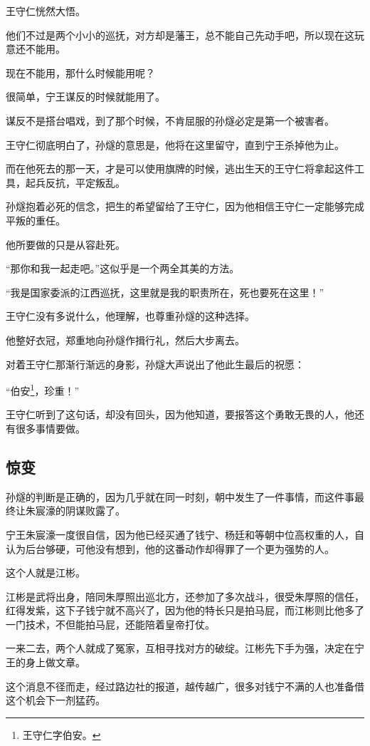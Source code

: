 \begin{multicols}{\theparacolNo}
		王守仁恍然大悟。

		他们不过是两个小小的巡抚，对方却是藩王，总不能自己先动手吧，所以现在这玩意还不能用。

		现在不能用，那什么时候能用呢？

		很简单，宁王谋反的时候就能用了。

		谋反不是搭台唱戏，到了那个时候，不肯屈服的孙燧必定是第一个被害者。

		王守仁彻底明白了，孙燧的意思是，他将在这里留守，直到宁王杀掉他为止。

		而在他死去的那一天，才是可以使用旗牌的时候，逃出生天的王守仁将拿起这件工具，起兵反抗，平定叛乱。

		孙燧抱着必死的信念，把生的希望留给了王守仁，因为他相信王守仁一定能够完成平叛的重任。

		他所要做的只是从容赴死。

		“那你和我一起走吧。”这似乎是一个两全其美的方法。

		“我是国家委派的江西巡抚，这里就是我的职责所在，死也要死在这里！”

		王守仁没有多说什么，他理解，也尊重孙燧的这种选择。

		他整好衣冠，郑重地向孙燧作揖行礼，然后大步离去。

		对着王守仁那渐行渐远的身影，孙燧大声说出了他此生最后的祝愿：

		“伯安\footnote{王守仁字伯安。}，珍重！”

		王守仁听到了这句话，却没有回头，因为他知道，要报答这个勇敢无畏的人，他还有很多事情要做。

		\subsection{惊变}
		孙燧的判断是正确的，因为几乎就在同一时刻，朝中发生了一件事情，而这件事最终让朱宸濠的阴谋败露了。

		宁王朱宸濠一度很自信，因为他已经买通了钱宁、杨廷和等朝中位高权重的人，自认为后台够硬，可他没有想到，他的这番动作却得罪了一个更为强势的人。

		这个人就是江彬。

		江彬是武将出身，陪同朱厚照出巡北方，还参加了多次战斗，很受朱厚照的信任，红得发紫，这下子钱宁就不高兴了，因为他的特长只是拍马屁，而江彬则比他多了一门技术，不但能拍马屁，还能陪着皇帝打仗。

		一来二去，两个人就成了冤家，互相寻找对方的破绽。江彬先下手为强，决定在宁王的身上做文章。

		这个消息不径而走，经过路边社的报道，越传越广，很多对钱宁不满的人也准备借这个机会下一剂猛药。


\end{multicols}
